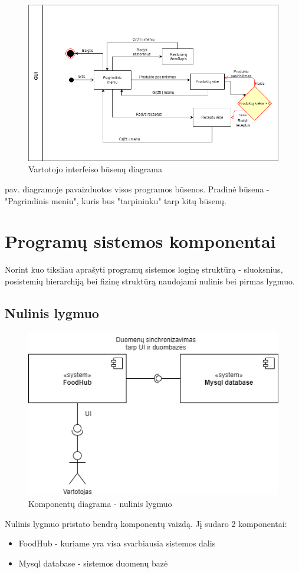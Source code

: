 \documentclass{VUMIFInfKursinis}
\begin{document}
\begin{figure}[H]
    \centering
 \includegraphics[scale=0.5]{img/dynamicDiagram}
    \caption{Vartotojo interfeiso būsenų diagrama}   %
    \label{img:mlp}
\end{figure}
 pav. diagramoje pavaizduotos visos programos būsenos. Pradinė būsena - "Pagrindinis meniu", kuris bus "tarpininku" tarp kitų būsenų. 


\section{Programų sistemos komponentai}
Norint kuo tiksliau aprašyti programų sistemos loginę struktūrą - sluoksnius, posistemių hierarchiją bei fizinę struktūrą naudojami nulinis bei pirmas lygmuo.
\subsection{Nulinis lygmuo}
\begin{figure}[H]
    \centering
 \includegraphics[scale=0.6]{img/progKomp}
    \caption{Komponentų diagrama - nulinis lygmuo}   %
    \label{img:mlp}
\end{figure}
\bigskip
Nulinis lygmuo pristato bendrą komponentų vaizdą. Jį sudaro 2 komponentai:
\begin{itemize}

\item {FoodHub - kuriame yra visa svarbiausia sistemos dalis}
\item {Mysql database - sistemos duomenų bazė}
\end{itemize}
\end{document}
